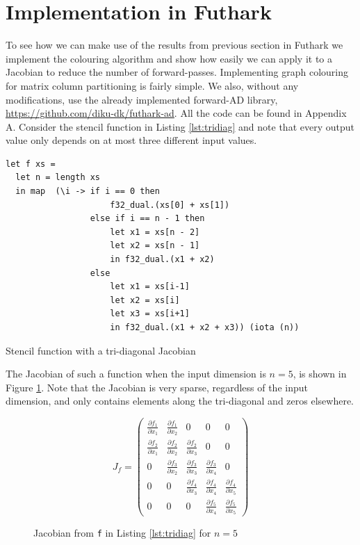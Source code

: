 \section{Implementation in Futhark}
To see how we can make use of the results from previous section 
in Futhark we implement the colouring algorithm and show how easily
we can apply it to a Jacobian to reduce the number of forward-passes. 
Implementing graph colouring for matrix column partitioning is fairly simple. We also, without any modifications, use the already implemented forward-AD library, \url{https://github.com/diku-dk/futhark-ad}. All the code can be found in Appendix A. 
Consider the stencil function in Listing \ref{lst:tridiag} and note that every output value only depends on at most three different input values.
\begin{listing}[H]
\begin{verbatim}
let f xs =
  let n = length xs
  in map  (\i -> if i == 0 then 
                     f32_dual.(xs[0] + xs[1])
                 else if i == n - 1 then
                     let x1 = xs[n - 2]
                     let x2 = xs[n - 1]
                     in f32_dual.(x1 + x2)
                 else
                     let x1 = xs[i-1]
                     let x2 = xs[i]
                     let x3 = xs[i+1]
                     in f32_dual.(x1 + x2 + x3)) (iota (n))
\end{verbatim}
\caption{Stencil function with a tri-diagonal Jacobian}
\label{lst:tridiag}
\end{listing}
The Jacobian of such a function when the input dimension is $n= 5$, is shown in Figure \ref{fig:tridiag}. Note that 
the Jacobian is very sparse, regardless of the input dimension, and only contains elements along the
tri-diagonal and zeros elsewhere.  
\begin{figure}[H]
	$$ J_{f} = \left(\begin{matrix}
	\frac{\partial f_1}{\partial x_1} & \frac{\partial f_1}{\partial x_2} & 0 & 0 & 0 \\
	\frac{\partial f_2}{\partial x_1}& \frac{\partial f_2}{\partial x_2} & \frac{\partial f_2}{\partial x_3} & 0 & 0\\
	0 & \frac{\partial f_3}{\partial x_2} & \frac{\partial f_3}{\partial x_3} & \frac{\partial f_3}{\partial x_4} & 0\\
	0 & 0 & \frac{\partial f_4}{\partial x_3} & \frac{\partial f_4}{\partial x_4} & \frac{\partial f_4}{\partial x_5} \\
	0 & 0 & 0 & \frac{\partial f_5}{\partial x_4} & \frac{\partial f_5}{\partial x_5}
	\end{matrix}\right) $$
	\caption{Jacobian from \texttt{f} in Listing \ref{lst:tridiag} for $n=5$}
	\label{fig:tridiag}
\end{figure}
